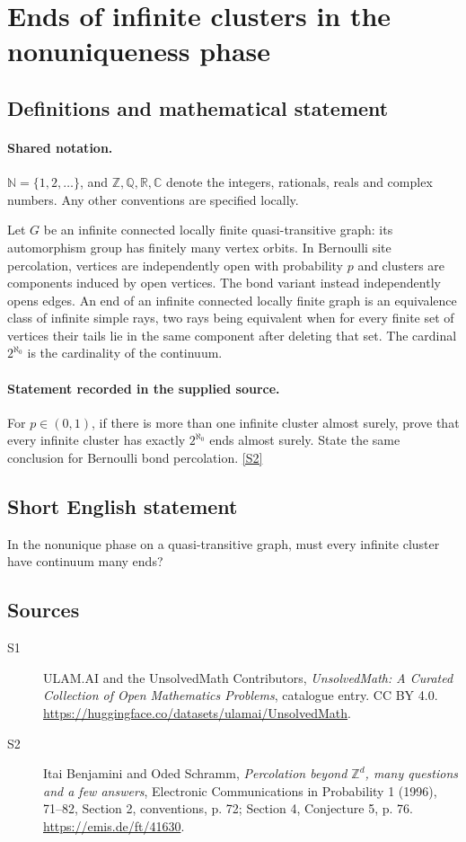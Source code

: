 \documentclass[11pt]{article}
\newcommand{\sref}[2]{\hyperlink{source:#1:#2}{[S#2]}}
\begin{document}
\section{Ends of infinite clusters in the nonuniqueness phase}\label{statement}

\subsection{Definitions and mathematical statement}

\paragraph{Shared notation.}$\mathbb N=\{1,2,\ldots\}$, and $\mathbb Z,\mathbb Q,\mathbb R,\mathbb C$ denote the integers, rationals, reals and complex numbers. Any other conventions are specified locally.


Let $G$ be an infinite connected locally finite quasi-transitive graph: its automorphism group has finitely many vertex orbits. In Bernoulli site percolation, vertices are independently open with probability $p$ and clusters are components induced by open vertices. The bond variant instead independently opens edges. An end of an infinite connected locally finite graph is an equivalence class of infinite simple rays, two rays being equivalent when for every finite set of vertices their tails lie in the same component after deleting that set. The cardinal $2^{\aleph_0}$ is the cardinality of the continuum.
\paragraph{Statement recorded in the supplied source.}
For $p\in(0,1)$, if there is more than one infinite cluster almost surely, prove that every infinite cluster has exactly $2^{\aleph_0}$ ends almost surely. State the same conclusion for Bernoulli bond percolation. \sref{statement}{2}
\subsection{Short English statement}
In the nonunique phase on a quasi-transitive graph, must every infinite cluster have continuum many ends?
\subsection{Sources}
\begin{description}
\item[\hypertarget{source:statement:1}{S1}] ULAM.AI and the UnsolvedMath Contributors, \emph{UnsolvedMath: A Curated Collection of Open Mathematics Problems}, catalogue entry. CC BY 4.0. \url{https://huggingface.co/datasets/ulamai/UnsolvedMath}.
\item[\hypertarget{source:statement:2}{S2}] Itai Benjamini and Oded Schramm, \emph{Percolation beyond $\mathbb Z^d$, many questions and a few answers}, Electronic Communications in Probability 1 (1996), 71--82, Section 2, conventions, p. 72; Section 4, Conjecture 5, p. 76. \url{https://emis.de/ft/41630}.
\end{description}
\label{end:statement}
\end{document}
